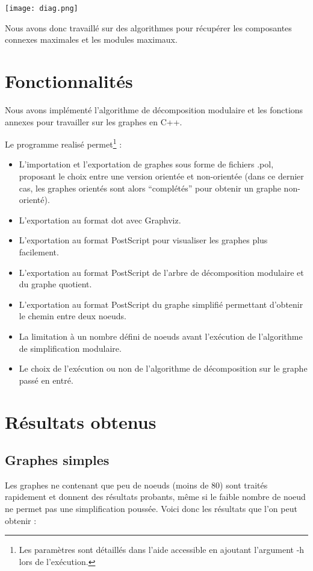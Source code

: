 \documentclass[pdftex,a4paper,titlepage,11pt,openright]{article}
\begin{document}
\texttt{[image: diag.png]}

Nous avons donc travaillé sur des algorithmes pour récupérer les composantes connexes maximales et les modules maximaux.


\newpage


\section{Fonctionnalités}

Nous avons implémenté l'algorithme de décomposition modulaire et les fonctions annexes pour travailler sur les graphes en C++.

Le programme realisé permet\footnote{Les paramètres sont détaillés dans l'aide accessible en ajoutant l'argument -h lors de l'exécution.} :
\begin{itemize}
	\item L'importation et l'exportation de graphes sous forme de fichiers .pol, proposant le choix entre une version orientée et non-orientée (dans ce dernier cas, les graphes orientés sont alors ``complétés'' pour obtenir un graphe non-orienté).
	\item L'exportation au format dot avec Graphviz.
	\item L'exportation au format PostScript pour visualiser les graphes plus facilement.
	\item L'exportation au format PostScript de l'arbre de décomposition modulaire et du graphe quotient.
	\item L'exportation au format PostScript du graphe simplifié permettant d'obtenir le chemin entre deux noeuds.
	\item La limitation à un nombre défini de noeuds avant l'exécution de l'algorithme de simplification modulaire.
	\item Le choix de l'exécution ou non de l'algorithme de décomposition sur le graphe passé en entré.
\end{itemize}


\newpage


\section{Résultats obtenus}

\subsection{Graphes simples}
Les graphes ne contenant que peu de noeuds (moins de 80) sont traités rapidement et donnent des résultats probants, même si le faible nombre de noeud ne permet pas une simplification poussée. Voici donc les résultats que l'on peut obtenir :
\end{document}
